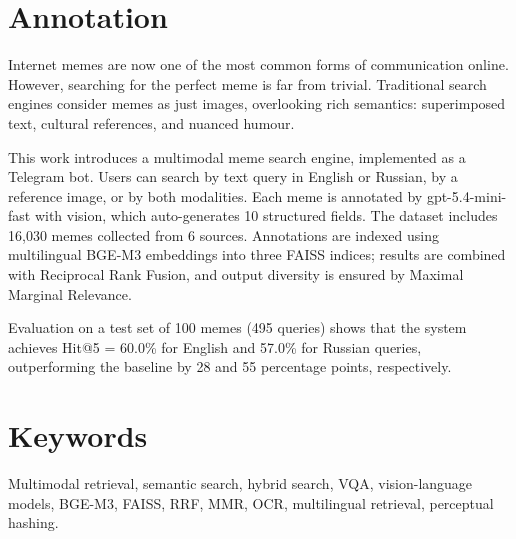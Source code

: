 \documentclass[a4paper,12pt]{article}
\begin{document}

\newpage
\setcounter{page}{2}

{
	\hypersetup{linkcolor=black}
	\tableofcontents
}

\newpage

\section*{Annotation}
Internet memes are now one of the most common forms of communication online. However, searching for the perfect meme is far from trivial. Traditional search engines consider memes as just images, overlooking rich semantics: superimposed text, cultural references, and nuanced humour.

This work introduces a multimodal meme search engine, implemented as a Telegram bot. Users can search by text query in English or Russian, by a reference image, or by both modalities. Each meme is annotated by gpt-5.4-mini-fast with vision, which auto-generates 10 structured fields. The dataset includes 16,030 memes collected from 6 sources. Annotations are indexed using multilingual BGE-M3 embeddings into three FAISS indices; results are combined with Reciprocal Rank Fusion, and output diversity is ensured by Maximal Marginal Relevance.

Evaluation on a test set of 100 memes (495 queries) shows that the system achieves Hit@5 = 60.0\% for English and 57.0\% for Russian queries, outperforming the baseline by 28 and 55 percentage points, respectively.

\section*{Keywords}
Multimodal retrieval, semantic search, hybrid search, VQA, vision-language models, BGE-M3, FAISS, RRF, MMR, OCR, multilingual retrieval, perceptual hashing.
\end{document}
